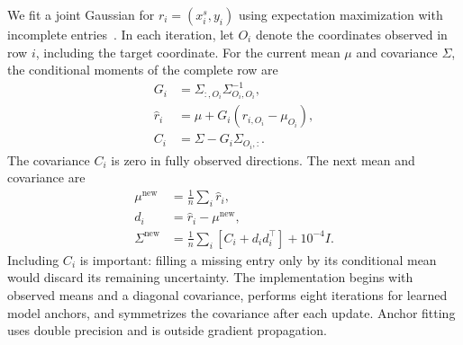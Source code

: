 We fit a joint Gaussian for $r_i=(x^{s}_i,y_i)$ using expectation maximization with incomplete entries~\citep{dempster1977em,little2019statistical}. In each iteration, let $O_i$ denote the coordinates observed in row $i$, including the target coordinate. For the current mean $\mu$ and covariance $\Sigma$, the conditional moments of the complete row are
\begin{align}
  G_i&=\Sigma_{:,O_i}\Sigma_{O_i,O_i}^{-1},\nonumber\\
  \widehat r_i
  &=\mu+G_i(r_{i,O_i}-\mu_{O_i}),\nonumber\\
  C_i
  &=\Sigma-G_i\Sigma_{O_i,:}.
  \label{meth:em-estep}
\end{align}
The covariance $C_i$ is zero in fully observed directions. The next mean and covariance are
\begin{align}
  \mu^{\mathrm{new}}&=\frac1n\sum_i\widehat r_i,\nonumber\\
  d_i&=\widehat r_i-\mu^{\mathrm{new}},\nonumber\\
  \Sigma^{\mathrm{new}}&=\frac1n\sum_i
   \left[C_i+d_id_i^\top\right]+10^{-4}I.
  \label{meth:em-mstep}
\end{align}
Including $C_i$ is important: filling a missing entry only by its conditional mean would discard its remaining uncertainty. The implementation begins with observed means and a diagonal covariance, performs eight iterations for learned model anchors, and symmetrizes the covariance after each update. Anchor fitting uses double precision and is outside gradient propagation.

